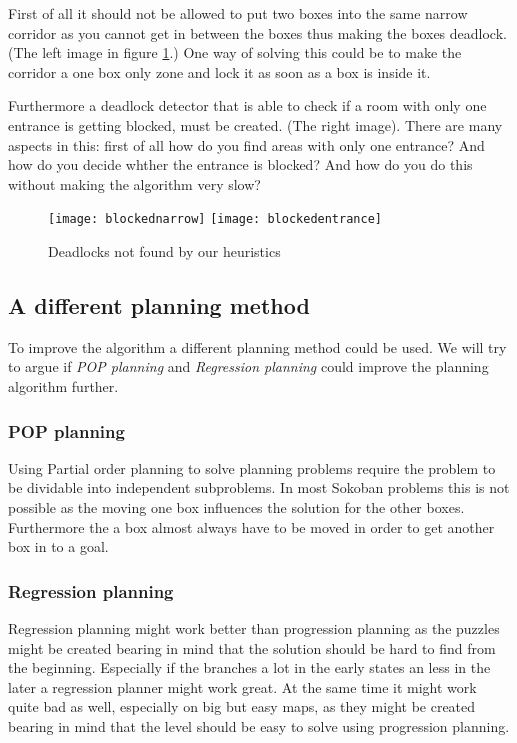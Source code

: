 First of all it should not be allowed to put two boxes into the same
narrow corridor as you cannot get in between the boxes thus making the
boxes deadlock. (The left image in figure \ref{fig:missingdeadlocks}.)
One way of solving this could be to make the corridor a one box only
zone and lock it as soon as a box is inside it.

Furthermore a deadlock detector that is able to check if a room with
only one entrance is getting blocked, must be created. (The right
image). There are many aspects in this: first of all how do you find
areas with only one entrance? And how do you decide whther the
entrance is blocked? And how do you do this without making the
algorithm very slow?

\begin{figure}[htp]
  \centering
  \texttt{[image: blockednarrow]}
  \texttt{[image: blockedentrance]}
  \caption{Deadlocks not found by our heuristics}
  \label{fig:missingdeadlocks}
\end{figure}

\subsection{A different planning method}
To improve the algorithm a different planning method could be used. We will try to argue if \textit{POP planning} and \textit{Regression planning} could improve the planning algorithm further.
\subsubsection{POP planning}
Using Partial order planning to solve planning problems require the problem to be dividable into independent subproblems. In most Sokoban problems this is not possible as the moving one box influences the solution for the other boxes. Furthermore the a box almost always have to be moved in order to get another box in to a goal.

\subsubsection{Regression planning}
Regression planning might work better than progression planning as the puzzles might be created bearing in mind that the solution should be hard to find from the beginning. Especially if the branches a lot in the early states an less in the later a regression planner might work great. At the same time it might work quite bad as well, especially on big but easy maps, as they might be created bearing in mind that the level should be easy to solve using progression planning.

